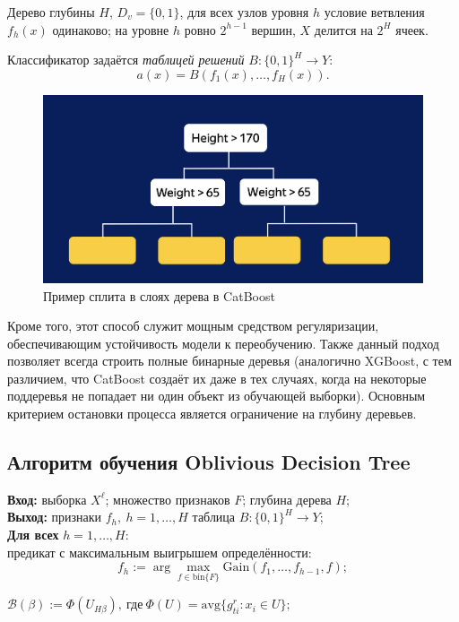 Дерево глубины $H$, $D_v = \{0, 1\}$, для всех узлов уровня $h$ условие ветвления $f_h(x)$ одинаково; на уровне $h$ ровно $2^{h-1}$ вершин, $X$ делится на $2^H$ ячеек.

Классификатор задаётся \textit{таблицей решений} $B: \{0,1\}^H \to Y$:
$$
    a(x) = B(f_1(x), \ldots, f_H(x)).
$$

\begin{figure}[ht]
    \centering
    \includegraphics[width=15cm]{chapters/boosting/images/Tree.png}
    \caption{Пример сплита в слоях дерева в CatBoost}
\end{figure}

Кроме того, этот способ служит мощным средством регуляризации, обеспечивающим устойчивость модели к переобучению. Также данный подход позволяет всегда строить полные бинарные деревья (аналогично XGBoost, с тем различием, что CatBoost создаёт их даже в тех случаях, когда на некоторые поддеревья не попадает ни один объект из обучающей выборки). Основным критерием остановки процесса является ограничение на глубину деревьев.

\subsection*{Алгоритм обучения Oblivious Decision Tree}

\begin{tcolorbox}[colback=black!10, colframe=black]
    \textbf{Вход:} выборка $X^\ell$; множество признаков $F$; глубина дерева $H$;\\
    \textbf{Выход:} признаки $f_h, \ h = 1, \ldots, H$  таблица $B: \{0,1\}^H \to Y$;\\
    \textbf{Для всех} $h = 1, \ldots, H$:\\
    предикат с максимальным выигрышем определённости:
    $$
        f_h := \arg\max_{f \in \mathrm{bin}\{F\}} \text{Gain}(f_1, \ldots, f_{h-1}, f);
    $$

    \(\mathcal{B}(\beta) := \Phi(U_{H\beta}), \ \text{где} \ \Phi(U) = \text{avg}\{g_{ti}^r : x_i \in U\};\)
\end{tcolorbox}

